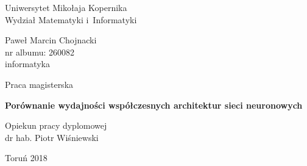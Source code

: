 \documentclass[a4paper,twoside,titlepage,openright]{book}
\begin{document}

\begin{titlepage}


\vspace*{1cm}
\begin{center}
\begin{Large}
Uniwersytet Mikołaja Kopernika\\[1mm]
Wydział Matematyki i~Informatyki\\[1mm]
\end{Large}
\end{center}

\vfill

\begin{center}
{\Large Paweł Marcin Chojnacki}\\
nr albumu: 260082\\
informatyka
\end{center}

\vfill

\begin{center}
{\Large Praca magisterska}
\end{center}

\vspace{0.5cm}

\begin{center}
{\Huge \textbf{Porównanie wydajności współczesnych architektur sieci neuronowych}}
\end{center}

\vspace{2cm}
\hfill
\begin{minipage}{6.5cm}
Opiekun pracy dyplomowej\\
dr hab. Piotr Wiśniewski
\end{minipage}

\vfill

\begin{center}
Toruń 2018
\end{center}

\end{titlepage}

\clearpage{\pagestyle{empty}\cleardoublepage}

\tableofcontents

\end{document}
